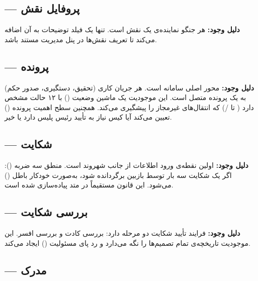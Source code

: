 \documentclass[12pt]{article} %
\theoremstyle{definition}
\begin{document}
\subsection{ — پروفایل نقش}

\textbf{دلیل وجود:}
هر  جنگو نماینده‌ی یک نقش است.  تنها یک فیلد توضیحات به آن اضافه می‌کند تا تعریف نقش‌ها در پنل مدیریت مستند باشد.

\subsection{ — پرونده}

\textbf{دلیل وجود:}
محور اصلی سامانه است. هر جریان کاری (تحقیق، دستگیری، صدور حکم) به یک پرونده متصل است.
این موجودیت یک ماشین وضعیت () با ۱۲ حالت مشخص دارد
( تا /) که انتقال‌های غیرمجاز را پیشگیری می‌کند.
همچنین سطح اهمیت پرونده () تعیین می‌کند آیا کیس نیاز به تأیید رئیس پلیس دارد یا خیر.

\subsection{ — شکایت}

\textbf{دلیل وجود:}
اولین نقطه‌ی ورود اطلاعات از جانب شهروند است.
منطق سه ضربه (): اگر یک شکایت سه بار توسط بازبین برگردانده شود، به‌صورت خودکار باطل () می‌شود.
این قانون مستقیماً در متد  پیاده‌سازی شده است.

\subsection{ — بررسی شکایت}

\textbf{دلیل وجود:}
فرایند تأیید شکایت دو مرحله دارد: بررسی کادت و بررسی افسر.
این موجودیت تاریخچه‌ی تمام تصمیم‌ها را نگه می‌دارد و رد پای مسئولیت () ایجاد می‌کند.

\subsection{ — مدرک}
\end{document}
